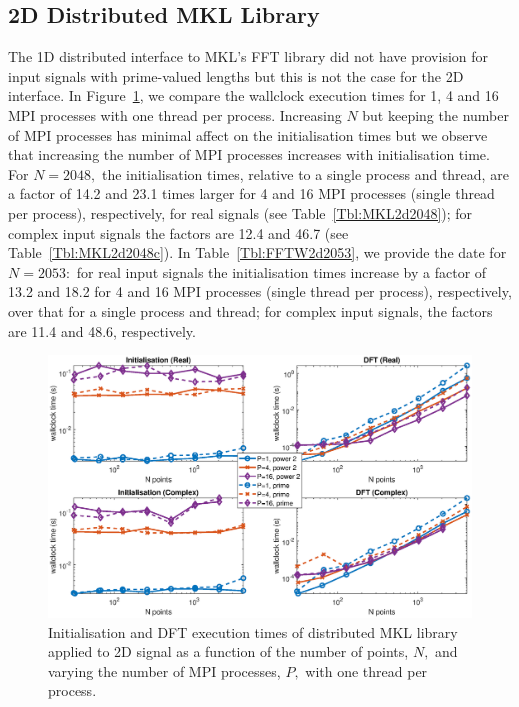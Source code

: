 \documentclass[a4paper]{article}
\begin{document}
\subsection{2D Distributed MKL Library}\label{Sec:2DDistMKL}
The 1D distributed interface to MKL's FFT library did not have
provision for input signals with prime-valued lengths but this is not
the case for the 2D interface. In Figure~\ref{2DDistMKL}, we compare
the wallclock execution times for 1, 4 and 16 MPI processes with one
thread per process. Increasing $N$ but keeping the number of MPI
processes has minimal affect on the initialisation times but we
observe that increasing the number of MPI processes increases with
initialisation time. For $N=2048,$ the initialisation times, relative
to a single process and thread, are a factor of 14.2 and 23.1 times
larger for 4 and 16 MPI processes (single thread per process),
respectively, for real signals (see Table~\ref{Tbl:MKL2d2048}); for
complex input signals the factors are 12.4 and 46.7 (see
Table~\ref{Tbl:MKL2d2048c}). In Table~\ref{Tbl:FFTW2d2053}, we provide
the date for $N=2053:$ for real input signals the initialisation times
increase by a factor of 13.2 and 18.2 for 4 and 16 MPI processes
(single thread per process), respectively, over that for a single
process and thread; for complex input signals, the factors are 11.4
and 48.6, respectively.


\begin{figure}[htb]
    \centering
    \includegraphics[width=0.9\linewidth]{../results/mkl_2d_mpi.eps}
  \caption{Initialisation and DFT execution times of distributed MKL library applied to 2D signal as a function of the
    number of points, $N,$ and varying the number of MPI processes, $P,$ with one thread per process.}
  \label{2DDistMKL}
\end{figure}
\end{document}
